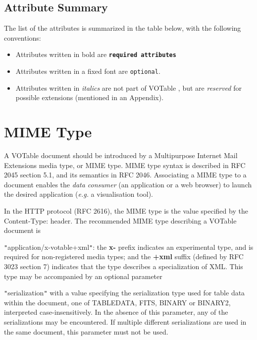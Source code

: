 \documentclass[11pt,a4paper]{ivoa}
\let\fg=\color
\def\attr#1{{\tt{\fg{DarkRed}#1}}}
\def\requiredattr#1{{\tt\bf{\fg{DarkBlue}#1}}}
\def\literalvalue#1{{\tt"}{{\fg{DarkPurple}#1}}{\tt"}}
\begin{document}
{\clearpage
\subsection{Attribute Summary}
The list of the attributes is summarized in the table below,
with the following conventions:
\begin{itemize}
\item   Attributes written in bold are \requiredattr{required attributes}
\item   Attributes written in a {fixed font} are \attr{optional}.
\item   Attributes written in {\it italics}
        are not part of VOTable \ivoaDocversion{}, but are {\it reserved}
        for possible extensions (mentioned in an Appendix).
\end{itemize}

\bigskip
\begin{quote}\small

\end{quote}

\clearpage
\section{MIME Type}
\label{sec:mime}
A VOTable document should be introduced by a
Multipurpose Internet Mail Extensions media type, or MIME type.
MIME type syntax is described in RFC 2045 section 5.1, and
its semantics in RFC 2046.
Associating a MIME type to a document enables the {\em data consumer}
(an application or a web browser) to launch the desired application
({\em e.g.} a visualisation tool).

In the HTTP protocol (RFC 2616), the MIME type is the value specified by the
{\textsf{Content-Type:}} header. The recommended MIME type describing
a VOTable document is {\literalvalue{\textsf{application/x-votable+xml}}:
the {\bf x-} prefix indicates an experimental type, and
is required for non-registered media types; and the
{\bf+xml} suffix (defined by RFC 3023 section 7)
indicates that the type describes a specialization of XML.
This type may be accompanied by an optional parameter
{\literalvalue{\textsf{serialization}}
with a value specifying the serialization type used for table data within the
document, one of TABLEDATA, FITS, BINARY or BINARY2,
interpreted case-insensitively.
In the absence of this parameter, any of the serializations may be
encountered.  If multiple different serializations are used in the same
document, this parameter must not be used.

}}}
\end{document}
